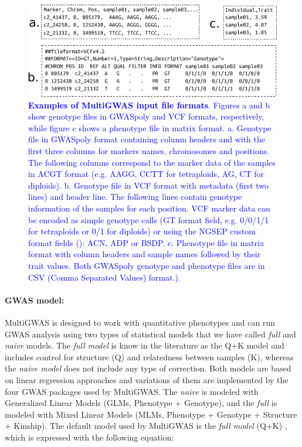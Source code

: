 \documentclass{article}
\begin{document}
\begin{figure}[H]
\begin{centering}
\includegraphics{images/paper-input-files}
\par\end{centering}
\caption{\scriptsize \textbf{\textcolor{blue}{Examples of MultiGWAS input file formats}}\textcolor{blue}{. Figures a and b show genotype files in GWASpoly and VCF formats, respectively, while figure c shows a phenotype file in matrix format. a. Genotype file in GWASpoly format containing column headers and with the first three columns for markers names, chromosomes and positions. The following columns correspond to the marker data of the samples in \textquotedbl{}ACGT\textquotedbl{} format (e.g. AAGG, CCTT for tetraploids, AG, CT for diploids). b. Genotype file in VCF format with metadata (first two lines) and header line. The following lines contain genotype information of the samples for each position. VCF marker data can be encoded as simple genotype calls (GT format field, e.g. 0/0/1/1 for tetraploids or 0/1 for diploids) or using the NGSEP custom format fields (\cite{Duitama2019}): ACN, ADP or BSDP. c. Phenotype file in matrix format with column headers and sample names followed by their trait values. Both GWASpoly genotype and phenotype files are in CSV (Comma Separated Values) format.).} \label{fig:File-Formats}\protect \\
}
\end{figure}


\paragraph{GWAS model:}

MultiGWAS is designed to work with quantitative phenotypes and can run GWAS analysis using two types of statistical models that we have called \emph{full} and \emph{naive} models. The \emph{full model} is know in the literature as the Q+K model \cite{Yu2006} and includes control for structure (Q) and relatedness between samples (K), whereas the \emph{naive model} does not include any type of correction. Both models are based on linear regression approaches and variations of them are implemented by the four GWAS packages used by MultiGWAS. The \emph{naive} is modeled with Generalized Linear Models (GLMs, Phenotype + Genotype), and the \emph{full} is modeled with Mixed Linear Models (MLMs, Phenotype + Genotype + Structure + Kinship). The default model used by MultiGWAS is the \emph{full model} (Q+K) \cite{Yu2006}, which is expressed with the following equation:
\end{document}
